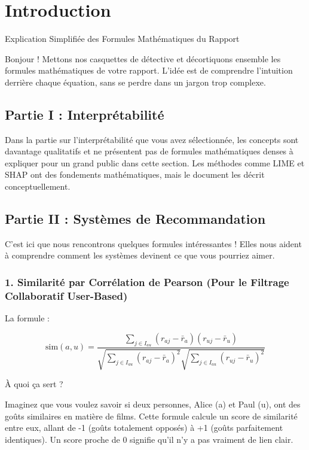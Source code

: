 \documentclass{article}
\begin{document}
\maketitle

\section{Introduction}

Explication Simplifiée des Formules Mathématiques du Rapport

Bonjour ! Mettons nos casquettes de détective et décortiquons ensemble les formules mathématiques de votre rapport. L'idée est de comprendre l'intuition derrière chaque équation, sans se perdre dans un jargon trop complexe.

\subsection{Partie I : Interprétabilité}

Dans la partie sur l'interprétabilité que vous avez sélectionnée, les concepts sont davantage qualitatifs et ne présentent pas de formules mathématiques denses à expliquer pour un grand public dans cette section. Les méthodes comme LIME et SHAP ont des fondements mathématiques, mais le document les décrit conceptuellement.

\subsection{Partie II : Systèmes de Recommandation}

C'est ici que nous rencontrons quelques formules intéressantes ! Elles nous aident à comprendre comment les systèmes devinent ce que vous pourriez aimer.

\subsubsection{1. Similarité par Corrélation de Pearson (Pour le Filtrage Collaboratif User-Based)}

La formule :

\[
\text{sim}(a,u) = \frac{\sum_{j \in I_{au}} \left( r_{aj} - \bar{r}_a \right) \left( r_{uj} - \bar{r}_u \right)}{\sqrt{\sum_{j \in I_{au}} \left( r_{aj} - \bar{r}_a \right)^2} \sqrt{\sum_{j \in I_{au}} \left( r_{uj} - \bar{r}_u \right)^2}}
\]

À quoi ça sert ?

Imaginez que vous voulez savoir si deux personnes, Alice (a) et Paul (u), ont des goûts similaires en matière de films. Cette formule calcule un score de similarité entre eux, allant de -1 (goûts totalement opposés) à +1 (goûts parfaitement identiques). Un score proche de 0 signifie qu'il n'y a pas vraiment de lien clair.
\end{document}
